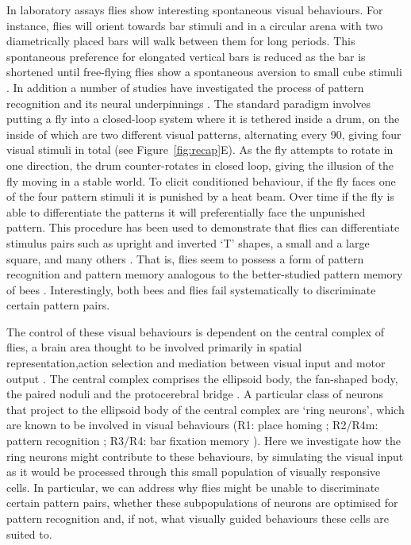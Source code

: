 In laboratory assays flies show interesting spontaneous visual behaviours. For instance, flies will orient towards bar stimuli \cite{Reichardt1969,Gotz1987} and in a circular arena with two diametrically placed bars will walk between them for long periods. This spontaneous preference for elongated vertical bars is reduced as the bar is shortened until free-flying flies show a spontaneous aversion to small cube stimuli \cite{Maimon2008}. In addition a number of studies have investigated the process of pattern recognition and its neural underpinnings \cite{Ernst1999,Liu2006,Pan2009}. The standard paradigm involves putting a fly into a closed-loop system where it is tethered inside a drum, on the inside of which are two different visual patterns, alternating every 90\degree, giving four visual stimuli in total (see Figure~\ref{fig:recap}E). As the fly attempts to rotate in one direction, the drum counter-rotates in closed loop, giving the illusion of the fly moving in a stable world. To elicit conditioned behaviour, if the fly faces one of the four pattern stimuli it is punished by a heat beam. Over time if the fly is able to differentiate the patterns it will preferentially face the unpunished pattern. This procedure has been used to demonstrate that flies can differentiate stimulus pairs such as upright and inverted `T' shapes, a small and a large square, and many others \cite{Ernst1999}. That is, flies seem to possess a form of pattern recognition and pattern memory analogous to the better-studied pattern memory of bees \cite{vonFrisch1914,Giurfa1997,Horridge2009}. Interestingly, both bees \cite{Srinivasan1994} and flies \cite{Ernst1999} fail systematically to discriminate certain pattern pairs. 

The control of these visual behaviours is dependent on the central complex of flies, a brain area thought to be involved primarily in spatial representation,action selection and mediation between visual input and motor output \cite{Pfeiffer2014}. The central complex comprises the ellipsoid body, the fan-shaped body, the paired noduli and the protocerebral bridge \cite{Young2010}. A particular class of neurons that project to the ellipsoid body of the central complex are `ring neurons', which are known to be involved in visual behaviours (R1: place homing \cite{Sitaraman2008,Sitaraman2010,Ofstad2011}; R2/R4m: pattern recognition \cite{Ernst1999,Liu2006,Pan2009}; R3/R4: bar fixation memory \cite{Neuser2008}). Here we investigate how the ring neurons might contribute to these behaviours, by simulating the visual input as it would be processed through this small population of visually responsive cells. In particular, we can address why flies might be unable to discriminate certain pattern pairs, whether these subpopulations of neurons are optimised for pattern recognition and, if not, what visually guided behaviours these cells are suited to.

